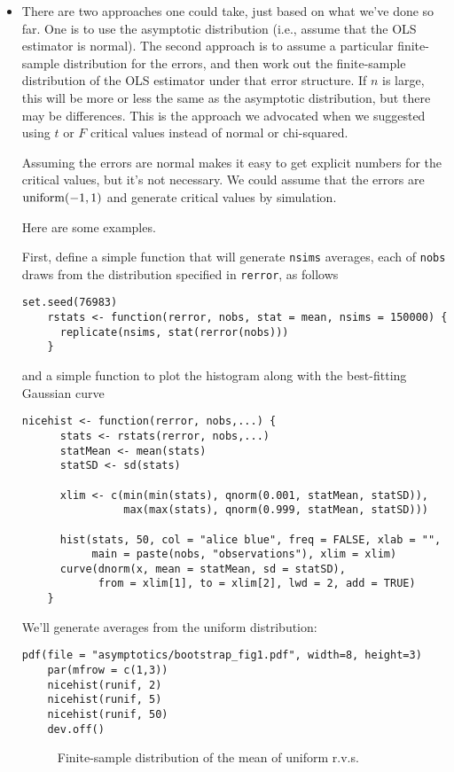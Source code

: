 \begin{itemize}

\item There are two approaches one could take, just based on what
  we've done so far.  One is to use the asymptotic distribution (i.e.,
  assume that the OLS estimator is normal).  The second approach is to
  assume a particular finite-sample distribution for the errors, and
  then work out the finite-sample distribution of the OLS estimator
  under that error structure.  If $n$ is large, this will be more or
  less the same as the asymptotic distribution, but there may be
  differences.  This is the approach we advocated when we suggested
  using $t$ or $F$ critical values instead of normal or chi-squared.

  Assuming the errors are normal makes it easy to get explicit numbers
  for the critical values, but it's not necessary.  We could assume
  that the errors are $\operatorname{uniform}(-1,1)$ and generate critical values by
  simulation.

  Here are some examples.

  First, define a simple function that will generate \lstinline|nsims|
  averages, each of \lstinline|nobs| draws from the distribution
  specified in \lstinline|rerror|, as follows
  \begin{lstlisting}[firstline=2,gobble=4]
    set.seed(76983)
    rstats <- function(rerror, nobs, stat = mean, nsims = 150000) {
      replicate(nsims, stat(rerror(nobs)))
    }
  \end{lstlisting}
  and a simple function to plot the histogram along with the
  best-fitting Gaussian curve
  \begin{lstlisting}[gobble=4]
    nicehist <- function(rerror, nobs,...) {
      stats <- rstats(rerror, nobs,...)
      statMean <- mean(stats)
      statSD <- sd(stats)
  
      xlim <- c(min(min(stats), qnorm(0.001, statMean, statSD)),
                max(max(stats), qnorm(0.999, statMean, statSD)))

      hist(stats, 50, col = "alice blue", freq = FALSE, xlab = "",
           main = paste(nobs, "observations"), xlim = xlim)
      curve(dnorm(x, mean = statMean, sd = statSD),
            from = xlim[1], to = xlim[2], lwd = 2, add = TRUE)
    }
  \end{lstlisting}

  We'll generate averages from the uniform distribution:
  \begin{lstlisting}[print=false]
    pdf(file = "asymptotics/bootstrap_fig1.pdf", width=8, height=3)
    par(mfrow = c(1,3))
    nicehist(runif, 2)
    nicehist(runif, 5)
    nicehist(runif, 50)
    dev.off()
  \end{lstlisting}
  \begin{figure*}
    \caption{Finite-sample distribution of the mean of uniform r.v.s.}
  \end{figure*}


\end{itemize}
